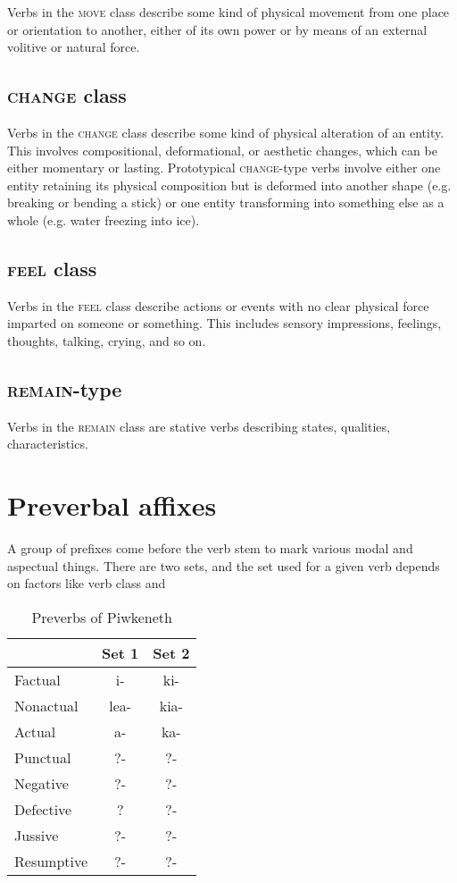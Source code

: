 \documentclass[smallroyalvopaper,9pt]{memoir}
\newcommand{\lang}{Piwkeneth}
\begin{document}
Verbs in the \textsc{move} class describe some kind of physical movement from one place or orientation to another, either of its own power or by means of an external volitive or natural force. 

\subsection{\textsc{change} class}

Verbs in the \textsc{change} class describe some kind of physical alteration of an entity. This involves compositional, deformational, or aesthetic changes, which can be either momentary or lasting. Prototypical \textsc{change}-type verbs involve either one entity retaining its physical composition but is deformed into another shape (e.g. breaking or bending a stick) or one entity transforming into something else as a whole (e.g. water freezing into ice).

\subsection{\textsc{feel} class}

Verbs in the \textsc{feel} class describe actions or events with no clear physical force imparted on someone or something. This includes sensory impressions, feelings, thoughts, talking, crying, and so on.

\subsection{\textsc{remain}-type}

Verbs in the \textsc{remain} class are stative verbs describing states, qualities, characteristics.

\section{Preverbal affixes}

A group of prefixes come before the verb stem to mark various modal and aspectual things. There are two sets, and the set used for a given verb depends on factors like verb class and 

\begin{table}[ht]
    \centering
    \begin{tabular}{lcc}
        \toprule
                   & Set 1  & Set 2 \\
        \midrule
        Factual    & i-     & ki- \\
        Nonactual  & lea-   & kia- \\
        Actual     & a-     & ka- \\
        Punctual   & ?-     & ?- \\
        Negative   & ?-     & ?- \\
        Defective  & ?      & ?- \\
        Jussive    & ?-     & ?- \\
        Resumptive & ?-     & ?- \\
        \bottomrule
    \end{tabular}
    \caption{Preverbs of \lang}
\end{table}
\end{document}
